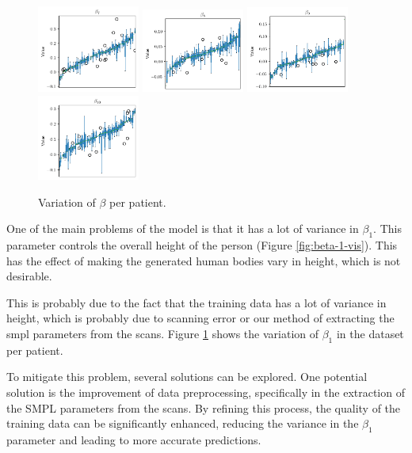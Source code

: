 \begin{figure}[h]
	\includegraphics[width=0.3\textwidth]{files/beta_var/beta_7_var.png}
	\includegraphics[width=0.3\textwidth]{files/beta_var/beta_8_var.png}
	\includegraphics[width=0.3\textwidth]{files/beta_var/beta_9_var.png}
	\includegraphics[width=0.3\textwidth]{files/beta_var/beta_10_var.png}

	\caption{Variation of $\beta$ per patient.}
	\label{fig:beta-var}
\end{figure}

One of the main problems of the model is that it has a lot of variance in
$\beta_1$. This parameter controls the overall height of the person (Figure
\ref{fig:beta-1-vis}). This has the effect of making the generated human bodies
vary in height, which is not desirable.

This is probably due to the fact that the training data has a lot of variance
in height, which is probably due to scanning error or our method of extracting
the \gls{smpl} parameters from the scans. Figure \ref{fig:beta-var} shows the
variation of $\beta_1$ in the dataset per patient.

To mitigate this problem, several solutions can be explored. One potential
solution is the improvement of data preprocessing, specifically in the
extraction of the SMPL parameters from the scans. By refining this process, the
quality of the training data can be significantly enhanced, reducing the
variance in the $\beta_1$ parameter and leading to more accurate predictions.

